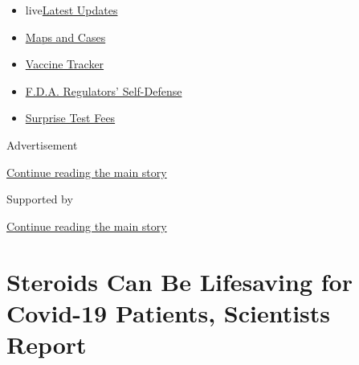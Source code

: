 \begin{itemize}
\tightlist
\item
  live\href{https://www.nytimes3xbfgragh.onion/2020/09/11/world/covid-19-coronavirus.html?name=styln-coronavirus-national\&region=TOP_BANNER\&block=storyline_menu_recirc\&action=click\&pgtype=Article\&impression_id=80393a71-f4ba-11ea-9f52-359fb3db6407\&variant=undefined}{Latest
  Updates}
\item
  \href{https://www.nytimes3xbfgragh.onion/interactive/2020/us/coronavirus-us-cases.html?name=styln-coronavirus-national\&region=TOP_BANNER\&block=storyline_menu_recirc\&action=click\&pgtype=Article\&impression_id=80393a72-f4ba-11ea-9f52-359fb3db6407\&variant=undefined}{Maps
  and Cases}
\item
  \href{https://www.nytimes3xbfgragh.onion/interactive/2020/science/coronavirus-vaccine-tracker.html?name=styln-coronavirus-national\&region=TOP_BANNER\&block=storyline_menu_recirc\&action=click\&pgtype=Article\&impression_id=80393a73-f4ba-11ea-9f52-359fb3db6407\&variant=undefined}{Vaccine
  Tracker}
\item
  \href{https://www.nytimes3xbfgragh.onion/2020/09/10/us/politics/fda-coronavirus-vaccine.html?name=styln-coronavirus-national\&region=TOP_BANNER\&block=storyline_menu_recirc\&action=click\&pgtype=Article\&impression_id=80396180-f4ba-11ea-9f52-359fb3db6407\&variant=undefined}{F.D.A.
  Regulators' Self-Defense}
\item
  \href{https://www.nytimes3xbfgragh.onion/2020/09/09/upshot/coronavirus-surprise-test-fees.html?name=styln-coronavirus-national\&region=TOP_BANNER\&block=storyline_menu_recirc\&action=click\&pgtype=Article\&impression_id=80396181-f4ba-11ea-9f52-359fb3db6407\&variant=undefined}{Surprise
  Test Fees}
\end{itemize}

Advertisement

\protect\hyperlink{after-top}{Continue reading the main story}

Supported by

\protect\hyperlink{after-sponsor}{Continue reading the main story}

\hypertarget{steroids-can-be-lifesaving-for-covid-19-patients-scientists-report}{%
\section{Steroids Can Be Lifesaving for Covid-19 Patients, Scientists
Report}\label{steroids-can-be-lifesaving-for-covid-19-patients-scientists-report}}

